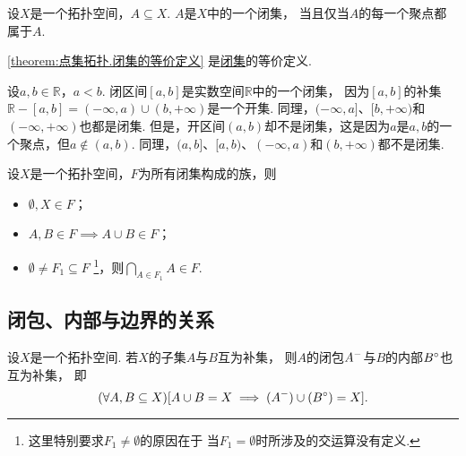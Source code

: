 \begin{theorem}\label{theorem:点集拓扑.闭集的等价定义}
设\(X\)是一个拓扑空间，\(A \subseteq X\).
\(A\)是\(X\)中的一个闭集，
当且仅当\(A\)的每一个聚点都属于\(A\).
\end{theorem}
\cref{theorem:点集拓扑.闭集的等价定义} 是\hyperref[definition:拓扑空间.闭集的定义]{闭集}的等价定义.

\begin{example}
设\(a,b\in\mathbb{R}\)，\(a<b\).
闭区间\([a,b]\)是实数空间\(\mathbb{R}\)中的一个闭集，
因为\([a,b]\)的补集\(\mathbb{R}-[a,b]
=(-\infty,a)\cup(b,+\infty)\)是一个开集.
同理，\((-\infty,a]\)、\([b,+\infty)\)和\((-\infty,+\infty)\)也都是闭集.
但是，开区间\((a,b)\)却不是闭集，这是因为\(a\)是\(a,b\)的一个聚点，但\(a\notin(a,b)\).
同理，\((a,b]\)、\([a,b)\)、\((-\infty,a)\)和\((b,+\infty)\)都不是闭集.
\end{example}

\begin{theorem}\label{theorem:拓扑学.闭集族的性质}
设\(X\)是一个拓扑空间，\(F\)为所有闭集构成的族，则
\begin{itemize}
	\item \(\emptyset,X \in F\)；
	\item \(A,B \in F \implies A \cup B \in F\)；
	\item \(\emptyset \neq F_1 \subseteq F\)
	\footnote{%
		这里特别要求\(F_1 \neq \emptyset\)的原因在于
		当\(F_1 = \emptyset\)时所涉及的交运算没有定义.
	}，则\(\bigcap_{A \in F_1} A \in F\).
\end{itemize}
\end{theorem}

\subsection{闭包、内部与边界的关系}
\begin{theorem}\label{theorem:拓扑学.内部与闭包的联系}
设\(X\)是一个拓扑空间.
若\(X\)的子集\(A\)与\(B\)互为补集，
则\(A\)的闭包\(A^-\)与\(B\)的内部\(B^\circ\)也互为补集，
即\begin{equation*}
	(\forall A,B \subseteq X)[A \cup B = X \implies (A^-) \cup (B^\circ) = X].
\end{equation*}
\end{theorem}

